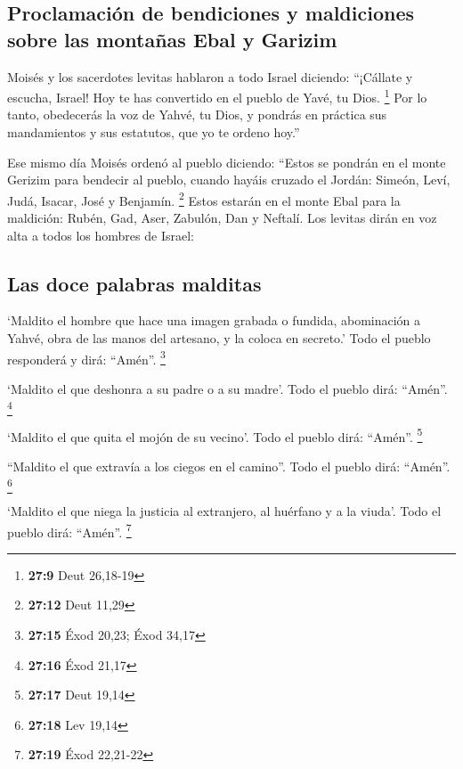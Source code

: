 \hypertarget{proclamaciuxf3n-de-bendiciones-y-maldiciones-sobre-las-montauxf1as-ebal-y-garizim}{%
\subsection{Proclamación de bendiciones y maldiciones sobre las montañas
Ebal y
Garizim}\label{proclamaciuxf3n-de-bendiciones-y-maldiciones-sobre-las-montauxf1as-ebal-y-garizim}}

 Moisés y los sacerdotes levitas hablaron a todo Israel
diciendo: ``¡Cállate y escucha, Israel! Hoy te has convertido en el
pueblo de Yavé, tu Dios. \footnote{\textbf{27:9} Deut 26,18-19}
 Por lo tanto, obedecerás la voz de Yahvé, tu Dios, y
pondrás en práctica sus mandamientos y sus estatutos, que yo te ordeno
hoy.''

 Ese mismo día Moisés ordenó al pueblo diciendo:
 ``Estos se pondrán en el monte Gerizim para bendecir al
pueblo, cuando hayáis cruzado el Jordán: Simeón, Leví, Judá, Isacar,
José y Benjamín. \footnote{\textbf{27:12} Deut 11,29} 
Estos estarán en el monte Ebal para la maldición: Rubén, Gad, Aser,
Zabulón, Dan y Neftalí.  Los levitas dirán en voz alta a
todos los hombres de Israel:

\hypertarget{las-doce-palabras-malditas}{%
\subsection{Las doce palabras
malditas}\label{las-doce-palabras-malditas}}

 `Maldito el hombre que hace una imagen grabada o
fundida, abominación a Yahvé, obra de las manos del artesano, y la
coloca en secreto.' Todo el pueblo responderá y dirá: ``Amén''.
\footnote{\textbf{27:15} Éxod 20,23; Éxod 34,17}

 `Maldito el que deshonra a su padre o a su madre'. Todo
el pueblo dirá: ``Amén''. \footnote{\textbf{27:16} Éxod 21,17}

 `Maldito el que quita el mojón de su vecino'. Todo el
pueblo dirá: ``Amén''. \footnote{\textbf{27:17} Deut 19,14}

 ``Maldito el que extravía a los ciegos en el camino''.
Todo el pueblo dirá: ``Amén''. \footnote{\textbf{27:18} Lev 19,14}

 `Maldito el que niega la justicia al extranjero, al
huérfano y a la viuda'. Todo el pueblo dirá: ``Amén''. \footnote{\textbf{27:19}
  Éxod 22,21-22}


